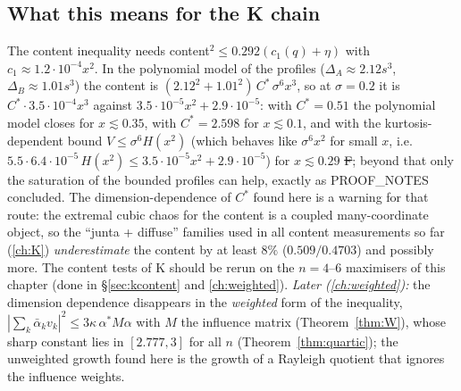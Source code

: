 \subsection{What this means for the K chain}
The content inequality needs content$^2\le0.292(c_1(q)+\eta)$ with $c_1\approx1.2\cdot10^{-4}x^2$. In the polynomial model of the profiles ($\Delta_A\approx2.12s^3$,
$\Delta_B\approx1.01s^3$) the content is $(2.12^2+1.01^2)\,C^*\,\sigma^6x^3$, so at $\sigma=0.2$ it is $C^*\cdot3.5\cdot10^{-4}x^3$ against $3.5\cdot10^{-5}x^2+2.9\cdot10^{-5}$: with
$C^*=0.51$ the polynomial model closes for $x\lesssim0.35$, with $C^*=2.598$ for $x\lesssim0.1$, and with the kurtosis-dependent bound $V\le\sigma^6H(x^2)$ (which behaves like $\sigma^6x^2$ for small $x$, i.e.\ $5.5\cdot6.4\cdot10^{-5}\,H(x^2)\le3.5\cdot10^{-5}x^2+2.9\cdot10^{-5}$) for $x\lesssim0.29$ \st{F}; beyond that only the saturation of the bounded profiles can help, exactly as
PROOF\_NOTES concluded. The dimension-dependence of $C^*$ found here is a warning for that route: the extremal cubic chaos for the content is a coupled many-coordinate object,
so the ``junta + diffuse'' families used in all content measurements so far (\autoref{ch:K}) \emph{underestimate} the content by at least $8\%$ ($0.509/0.4703$) and
possibly more. The content tests of K should be rerun on the $n=4$--$6$ maximisers of this chapter (done in \S\ref{sec:kcontent} and \autoref{ch:weighted}). \emph{Later (\autoref{ch:weighted}):} the dimension dependence disappears in the
\emph{weighted} form of the inequality, $|\sum_k\bar\alpha_kv_k|^2\le3\kappa\,\alpha^*M\alpha$ with $M$ the influence matrix (Theorem~\ref{thm:W}), whose sharp constant lies in $[2.777,3]$ for all $n$ (Theorem~\ref{thm:quartic}); the
unweighted growth found here is the growth of a Rayleigh quotient that ignores the influence weights.


